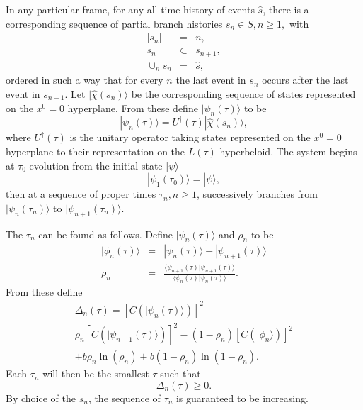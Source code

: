 \documentclass[12pt,amsmath,amssymb,onecolumn]{revtex4-2}
\begin{document}
In any particular frame, for any all-time history of events $\hat{s}$,
there is a corresponding sequence of partial branch histories
$s_n \in S, n \ge 1,$ with
\begin{subequations}
  \begin{eqnarray}
    \label{partialbranch0}
    | s_n | & = & n, \\
    \label{partialbranch1}
    s_n  & \subset & s_{n + 1}, \\
    \label{partialbranch2}
    \cup_n s_n & = & \hat{s},
  \end{eqnarray}
\end{subequations}
ordered in such a way that for every $n$  the last event in $s_n$ occurs
after the last event in $s_{n-1}$.
Let $|\hat{\chi}( s_n) \rangle $ be the corresponding sequence of states
represented on the $x^0 = 0$ hyperplane.
From these define $|\psi_n(\tau) \rangle $ to be
\begin{equation}
  \label{movedtoh}
  |\psi_n( \tau) \rangle  = U^\dagger( \tau) |\hat{\chi}(s_n) \rangle ,
\end{equation}
where  $U^\dagger(\tau)$ is the unitary operator taking states
represented on the $x^0 = 0$ hyperplane to their representation
on the $L(\tau)$ hyperbeloid. The system begins at $\tau_0$
evolution from the initial state $|\psi \rangle $
\begin{equation}
  \label{psi1psi}
  |\psi_1( \tau_0) \rangle  = |\psi \rangle ,
\end{equation}
then at a sequence of proper times
$\tau_n, n \ge 1$,
successively branches from $|\psi_n( \tau_n) \rangle $ to $|\psi_{n+1}( \tau_n) \rangle $.

The $\tau_n$ can be found
as follows.
Define
$|\psi_n(\tau) \rangle $ and $\rho_n$ to be
\begin{subequations}
  \begin{eqnarray}
    \label{psi11}
    |\phi_n(\tau) \rangle  & = &  |\psi_n( \tau) \rangle  - |\psi_{n+1}(\tau) \rangle  \\
     \label{timeview0}
    \rho_n & = & \frac{  \langle \psi_{n+1}( \tau)|\psi_{n+1}( \tau) \rangle }{  \langle \psi_n( \tau)|\psi_n( \tau) \rangle } .
  \end{eqnarray}
\end{subequations}
From these define
\begin{multline}
  \label{defdeltan}
  \Delta_n( \tau) = [C( |\psi_n( \tau)  \rangle )]^2 - \\
  \rho_n [C( |\psi_{n+1}(\tau) \rangle )]^2 - ( 1 - \rho_n) [C( |\phi_n \rangle )]^2 \\
+b \rho_n \ln( \rho_n) + b ( 1 - \rho_n) \ln( 1 - \rho_n).
\end{multline}
Each $\tau_n$ will then be the smallest $\tau$ such that
\begin{equation}
  \label{branchn}
  \Delta_n( \tau) \ge 0.
\end{equation}
By choice of the $s_n$,
the sequence of $\tau_n$ is guaranteed to be increasing.
\end{document}
